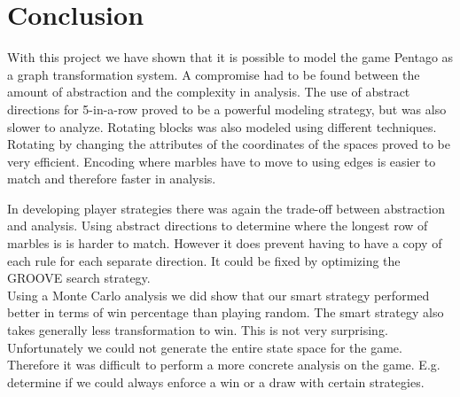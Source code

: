 \section{Conclusion}
\label{Conclusion}

With this project we have shown that it is possible to model the game Pentago as a graph transformation system.
A compromise had to be found between the amount of abstraction and the complexity in analysis. The use of abstract directions for 5-in-a-row proved to be a powerful modeling strategy, but was also slower to analyze. 
Rotating blocks was also modeled using different techniques. Rotating by changing the attributes of the coordinates of the spaces proved to be very efficient. Encoding where marbles have to move to using edges is easier to match and therefore faster in analysis.

In developing player strategies there was again the trade-off between abstraction and analysis. Using abstract directions to determine where the longest row of marbles is is harder to match. However it does prevent having to have a copy of each rule for each separate direction.
It could be fixed by optimizing the GROOVE search strategy.\\
Using a Monte Carlo analysis we did show that our smart strategy performed better in terms of win percentage than playing random. The smart strategy also takes generally less transformation to win. This is not very surprising.
Unfortunately we could not generate the entire state space for the game. Therefore it was difficult to perform a more concrete analysis on the game. E.g. determine if we could always enforce a win or a draw with certain strategies.
